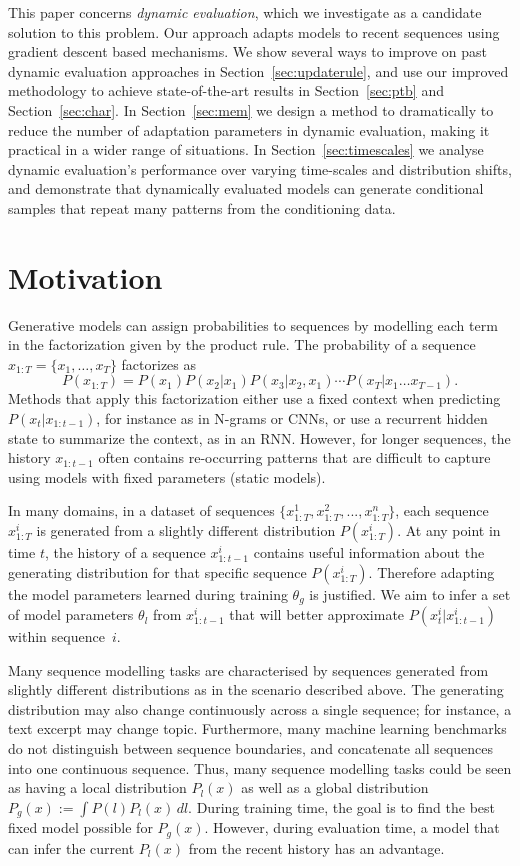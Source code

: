 \documentclass{article}
\begin{document}
This paper concerns \emph{dynamic evaluation}, which we investigate as a candidate solution to this problem. Our approach adapts models to recent sequences using gradient descent based mechanisms. We show several ways to improve on past dynamic evaluation approaches in Section~\ref{sec:updaterule}, and use our improved methodology to achieve state-of-the-art results in Section~\ref{sec:ptb} and Section~\ref{sec:char}. In Section~\ref{sec:mem} we design a method to dramatically to reduce the number of adaptation parameters in dynamic evaluation, making it practical in a wider range of situations. In Section~\ref{sec:timescales} we analyse dynamic evaluation's performance over varying time-scales and distribution shifts, and demonstrate that dynamically evaluated models can generate conditional samples that repeat many patterns from the conditioning data. 

\section{Motivation}
Generative models can assign probabilities to sequences by modelling each term in the factorization given by the product rule. 
The probability of a sequence $x_{1:T} = \{x_1,\dots,x_T\}$ factorizes as
\begin{equation}
P(x_{1:T}) = P(x_1) P(x_2|x_1)P(x_3|x_2,x_1)\cdots P(x_T|x_1\dots x_{T-1}).
\end{equation} 
Methods that apply this factorization either use a fixed context when predicting $P(x_t|x_{1:t-1})$, for instance as in N-grams or CNNs, or use a recurrent hidden state to summarize the context, as in an RNN\@. However, for longer sequences, the history $x_{1:t-1}$ often contains re-occurring patterns that are difficult to capture using models with fixed parameters (static models).

In many domains, in a dataset of sequences $\{x^1_{1:T},x^2_{1:T},...,x^n_{1:T}\}$, each sequence $x^i_{1:T}$ is generated from a slightly different distribution $P(x^i_{1:T})$. At any point in time $t$, the history of a sequence $x^{i}_{1:t-1}$ contains useful information about the generating distribution for that specific sequence $P(x^i_{1:T})$.  Therefore adapting the model parameters learned during training $\theta_g$ is justified. We aim to infer a set of model parameters $\theta_l$ from $x^i_{1:t-1}$ that will better approximate $P(x^i_t|x^i_{1:t-1})$ within sequence~$i$.

Many sequence modelling tasks are characterised by sequences generated from slightly different distributions as in the scenario described above. The generating distribution may also change continuously across a single sequence; for instance, a text excerpt may change topic. Furthermore, many machine learning benchmarks do not distinguish between sequence boundaries, and concatenate all sequences into one continuous sequence. 
Thus, many sequence modelling tasks could be seen as having a local distribution $P_l(x)$ as well as a global distribution $P_g(x) := \int P(l) P_l(x) \, dl$. During training time, the goal is to find the best fixed model possible for $P_g(x)$. However, during evaluation time, a model that can infer the current $P_l(x)$ from the recent history has an advantage.
\end{document}
